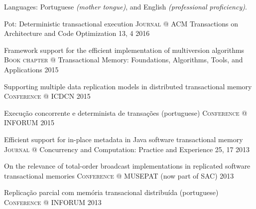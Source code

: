 \documentclass[10pt,a4paper]{article}
\begin{document}
\inlineheadsection
  {Languages:}
  {Portuguese \emph{(mother tongue)}, and English \emph{(professional proficiency)}.}


\spacedhrule{1.6em}{-0.4em}



\headedsection
  {Pot: Deterministic transactional execution}
  {\textsc{Journal}} {%
  \headedsubsection
    {@ ACM Transactions on Architecture and Code Optimization 13, 4}
    {2016}
    {}
}

\headedsection
  {Framework support for the efficient implementation of multiversion algorithms}
  {\textsc{Book chapter}} {%
  \headedsubsection
    {@ Transactional Memory: Foundations, Algorithms, Tools, and Applications}
    {2015}
    {}
}

\headedsection
  {Supporting multiple data replication models in distributed transactional memory}
  {\textsc{Conference}} {%
  \headedsubsection
    {@ ICDCN}
    {2015}
    {}
}

\headedsection
  {Execu\c{c}\~{a}o concorrente e determinista de transa\c{c}\~{o}es (portuguese)}
  {\textsc{Conference}} {%
  \headedsubsection
    {@ INFORUM}
    {2015}
    {}
}

\headedsection
  {Efficient support for in-place metadata in Java software transactional memory}
  {\textsc{Journal}} {%
  \headedsubsection
    {@ Concurrency and Computation: Practice and Experience 25, 17}
    {2013}
    {}
}

\headedsection
  {On the relevance of total-order broadcast implementations in replicated software transactional memories}
  {\textsc{Conference}} {%
  \headedsubsection
    {@ MUSEPAT (now part of SAC)}
    {2013}
    {}
}

\headedsection
  {Replica\c{c}\~{a}o parcial com mem\'{o}ria transacional distribu\'{i}da (portuguese)}
  {\textsc{Conference}} {%
  \headedsubsection
    {@ INFORUM}
    {2013}
    {}
}
\end{document}
